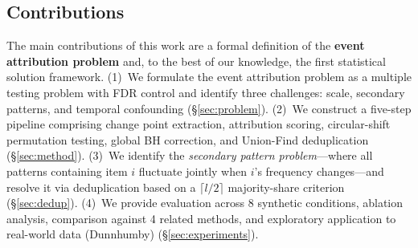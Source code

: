 \subsection{Contributions}

The main contributions of this work are a formal definition of the
\textbf{event attribution problem} and, to the best of our knowledge, the first statistical solution framework.
(1)~We formulate the event attribution problem as a multiple testing problem
with FDR control and identify three challenges: scale, secondary patterns,
and temporal confounding (\S\ref{sec:problem}).
(2)~We construct a five-step pipeline comprising change point extraction,
attribution scoring, circular-shift permutation testing, global BH correction,
and Union-Find deduplication (\S\ref{sec:method}).
(3)~We identify the \emph{secondary pattern problem}---where all patterns containing item $i$
fluctuate jointly when $i$'s frequency changes---and resolve it
via deduplication based on a $\lceil l/2 \rceil$ majority-share criterion (\S\ref{sec:dedup}).
(4)~We provide evaluation across 8 synthetic conditions, ablation analysis,
comparison against 4 related methods, and exploratory application
to real-world data (Dunnhumby) (\S\ref{sec:experiments}).
